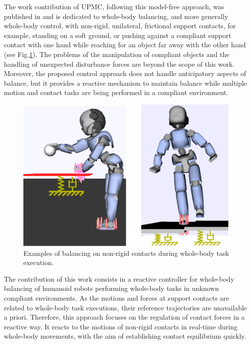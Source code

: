 The work contribution of UPMC, following this model-free approach, was published in \cite{liu_IROS2015} and is dedicated to whole-body balancing, and more generally whole-body control, with non-rigid, unilateral, frictional support contacts, for example, standing on a soft ground, or pushing against a compliant support contact with one hand while reaching for an object far away with the other hand (see Fig.\ref{reaching}). The problems of the manipulation of compliant objects and the handling of unexpected disturbance forces are beyond the scope of this work. Moreover, the proposed control approach does not handle anticipatory aspects of balance, but it provides a reactive  mechanism to maintain balance while multiple motion and contact tasks are being performed in a compliant environment.\\
\begin{figure}[!t]
\centering
\vspace{5pt}
\includegraphics[width=.6\linewidth]{images/scenario.pdf}
\caption{Examples of balancing on non-rigid contacts during whole-body task execution.}
\label{reaching}
\end{figure}

The contribution of this work consists in a reactive controller for whole-body balancing of humanoid robots performing whole-body tasks in unknown compliant environments. As the motions and forces at support contacts are related to whole-body task executions, their reference trajectories are unavailable a priori. Therefore, this approach focuses on the regulation of contact forces in a reactive way. It reacts to the motions of non-rigid contacts in real-time during whole-body movements, with the aim of establishing contact equilibrium quickly.


